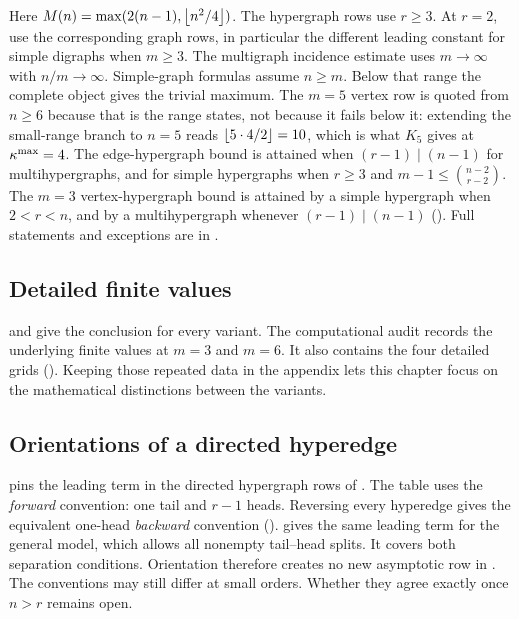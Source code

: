 Here $M(n)=\max(2(n-1),\left\lfloor n^2/4 \right\rfloor)$. The hypergraph rows use $r\ge3$. At $r=2$, use the corresponding graph rows, in particular the different leading constant for simple digraphs when $m\ge3$. The multigraph incidence estimate uses $m\to\infty$ with $n/m\to\infty$. Simple-graph formulas assume
$n\ge m$. Below that range the complete object gives the trivial maximum.
The $m=5$ vertex row is quoted from $n\ge6$ because that is the range
\cite{SorensenThomassen74} states, not because it fails below it: extending the
small-range branch to $n=5$ reads $\left\lfloor 5\cdot4/2 \right\rfloor=10$, which is what $K_5$
gives at $\kappa^{\max}=4$.
The edge-hypergraph bound is attained when $(r-1)\mid(n-1)$ for
multihypergraphs, and for simple hypergraphs when $r\ge3$ and
$m-1\le\binom{n-2}{r-2}$. The $m=3$ vertex-hypergraph bound is attained by a simple hypergraph when
$2<r<n$, and by a multihypergraph whenever
$(r-1)\mid(n-1)$ (). Full statements and
exceptions are in
.

\subsection{Detailed finite values}

 and  give the conclusion for every variant.
The computational audit records the underlying finite values at $m=3$ and $m=6$.
It also contains the four detailed grids ().
Keeping those repeated data in the appendix lets this chapter focus on the mathematical distinctions between the variants.

\subsection{Orientations of a directed hyperedge}


 pins the leading term in the directed hypergraph rows of .
The table uses the \emph{forward} convention: one tail and $r-1$ heads.
Reversing every hyperedge gives the equivalent one-head \emph{backward} convention ().
 gives the same leading term for the general model, which allows all nonempty tail--head splits.
It covers both separation conditions.
Orientation therefore creates no new asymptotic row in .
The conventions may still differ at small orders.
Whether they agree exactly once $n>r$ remains open.

